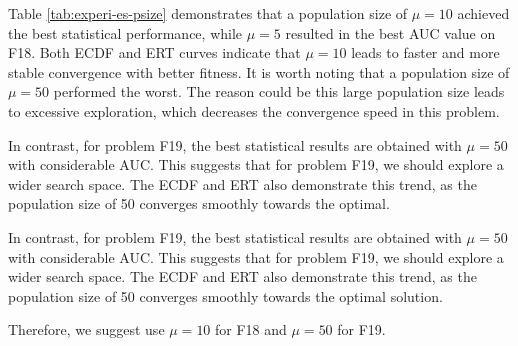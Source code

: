 \documentclass{article}
\begin{document}
Table \ref{tab:experi-es-psize} demonstrates that a population size of $\mu = 10$ achieved the best statistical performance, while $\mu = 5$ resulted in the best AUC value on F18. Both ECDF and ERT curves indicate that $\mu = 10$ leads to faster and more stable convergence with better fitness. It is worth noting that a population size of $\mu = 50$ performed the worst. The reason could be this large population size leads to excessive exploration, which decreases the convergence speed in this problem. 

In contrast, for problem F19, the best statistical results are obtained with $\mu = 50$ with considerable AUC. This suggests that for problem F19, we should explore a wider search space. The ECDF and ERT also demonstrate this trend, as the population size of 50 converges smoothly towards the optimal.

In contrast, for problem F19, the best statistical results are obtained with $\mu = 50$ with considerable AUC. This suggests that for problem F19, we should explore a wider search space. The ECDF and ERT also demonstrate this trend, as the population size of 50 converges smoothly towards the optimal solution.

Therefore, we suggest use $\mu = 10$ for F18 and $\mu = 50$ for F19.
\end{document}
